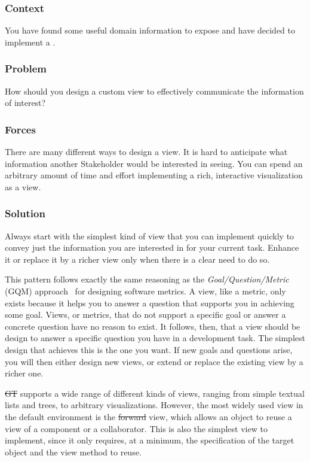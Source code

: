 \documentclass[sigconf]{acmart}
\newcommand{\pattern}[1]{\emph{\nameref{pat:#1}}\xspace}
\newcommand{\GT}{\st{GT}\xspace} %
\begin{document}
\subsubsection*{Context}
You have found some useful domain information to expose and have decided to implement a \pattern{customView}.

\subsubsection*{Problem}
How should you design a custom view to effectively communicate the information of interest?

\subsubsection*{Forces}
There are many different ways to design a view.
It is hard to anticipate what information another Stakeholder would be interested in seeing.
You can spend an arbitrary amount of time and effort implementing a rich, interactive visualization as a view.

\subsubsection*{Solution}
Always start with the simplest kind of view that you can implement quickly to convey just the information you are interested in for your current task.
Enhance it or replace it by a richer view only when there is a clear need to do so.

This pattern follows exactly the same reasoning as the \emph{Goal/Question/Metric} (GQM) approach~\cite{Basi94a} for designing software metrics.
A view, like a metric, only exists because it helps you to answer a question that supports you in achieving some goal.
Views, or metrics, that do not support a specific goal or answer a concrete question have no reason to exist.
It follows, then, that a view should be design to answer a specific question you have in a development task.
The simplest design that achieves this is the one you want.
If new goals and questions arise, you will then either design new views, or extend or replace the existing view by a richer one.

\GT supports a wide range of different kinds of views, ranging from simple textual lists and trees, to arbitrary visualizations.
However, the most widely used view in the default environment is the \st{forward} view, which allows an object to reuse a view of a component or a collaborator.
This is also the simplest view to implement, since it only requires, at a minimum, the specification of the target object and the view method to reuse.
\end{document}
